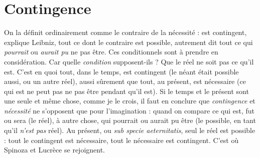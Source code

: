 
\section{Contingence}
On la définit ordinairement comme le contraire de la nécessité :
est contingent, explique Leibniz, tout ce dont le
contraire est possible, autrement dit tout ce qui {\it pourrait} ou {\it aurait pu} ne pas
être. Ces conditionnels sont à prendre en considération. Car quelle {\it condition} supposent-ils ?
Que le réel ne soit pas ce qu’il est. C’est en quoi tout, dans le temps,
est contingent (le néant était possible aussi, ou un autre réel), aussi sûrement que
tout, au présent, est nécessaire (ce qui est ne peut pas ne pas être pendant qu’il
est). Si le temps et le présent sont une seule et même chose, comme je le crois, il
faut en conclure que {\it contingence} et {\it nécessité} ne s'opposent que pour l’imagination :
quand on compare ce qui est, fut ou sera (le réel), à autre chose, qui
pourrait ou aurait pu être (le possible, en tant qu’il {\it n'est pas} réel). Au présent, ou
{\it sub specie aeternitatis}, seul le réel est possible : tout le contingent est nécessaire,
tout le nécessaire est contingent. C’est où Spinoza et Lucrèce se rejoignent.

